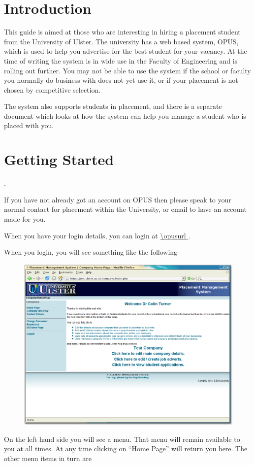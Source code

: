 \section{Introduction}

This guide is aimed at those who are interesting in hiring a placement student from the
University of Ulster. The university has a web based system, OPUS,
which is used to help you advertise for the best student for your vacancy. At the time of
writing the system is in wide use in the Faculty of Engineering and is rolling out further.
You may not be able to use the system if the school or faculty you normally do business with
does not yet use it, or if your placement is not chosen by competitive selection.

The system also supports students in placement, and there is a separate document
which looks at how the system can help you manage a student who is placed with you.

\section{Getting Started}.

If you have not already got an account on OPUS then please speak to your normal contact
for placement within the University, or email
to have an account made for you.

When you have your login details, you can login at \url{\opusurl }.

When you login, you will see something like the following
\begin{figure}[htb]
\begin{center}
\includegraphics[scale=0.25]{png/company_hr1.png}
\end{center}
\end{figure}
On the left hand side you will see a menu. That menu will remain available to you
at all times. At any time clicking on ``Home Page'' will return you here. The other menu
items in turn are

